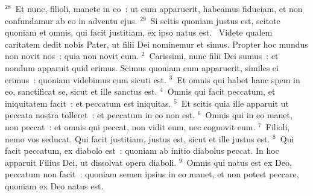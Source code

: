 ${}^{28}$~Et nunc, filioli, manete in eo~: ut cum apparuerit, habeamus fiduciam, et non confundamur ab eo in adventu ejus.
${}^{29}$~Si scitis quoniam justus est, scitote quoniam et omnis, qui facit justitiam, ex ipso natus est.
~\lettrine[lines=10,image=true,loversize=0.05,lraise=-0.03]{V}{}idete qualem caritatem dedit nobis Pater, ut filii Dei nominemur et simus. Propter hoc mundus non novit nos~: quia non novit eum.
${}^{2}$~Carissimi, nunc filii Dei sumus~: et nondum apparuit quid erimus. Scimus quoniam cum apparuerit, similes ei erimus~: quoniam videbimus eum sicuti est.
${}^{3}$~Et omnis qui habet hanc spem in eo, sanctificat se, sicut et ille sanctus est.
${}^{4}$~Omnis qui facit peccatum, et iniquitatem facit~: et peccatum est iniquitas.
${}^{5}$~Et scitis quia ille apparuit ut peccata nostra tolleret~: et peccatum in eo non est.
${}^{6}$~Omnis qui in eo manet, non peccat~: et omnis qui peccat, non vidit eum, nec cognovit eum.
${}^{7}$~Filioli, nemo vos seducat. Qui facit justitiam, justus est, sicut et ille justus est.
${}^{8}$~Qui facit peccatum, ex diabolo est~: quoniam ab initio diabolus peccat. In hoc apparuit Filius Dei, ut dissolvat opera diaboli.
${}^{9}$~Omnis qui natus est ex Deo, peccatum non facit~: quoniam semen ipsius in eo manet, et non potest peccare, quoniam ex Deo natus est.


